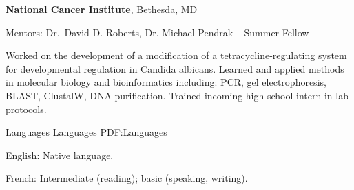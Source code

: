 \documentclass[letterpaper,MMMyyyy,nonstopmode]{simpleresumecv}
\begin{document}
\begin{Body}
\Entry
{\textbf{National Cancer Institute}},
Bethesda, MD

\Gap
\BulletItem
Mentors: Dr.~David D. Roberts, Dr. Michael Pendrak
\hfill
{}--
\newline
Summer Fellow
\begin{Detail}
\SubBulletItem
Worked on the development of a modification of a tetracycline-regulating system for developmental regulation in Candida albicans.
\SubBulletItem
Learned and applied methods in molecular biology and bioinformatics including: PCR, gel electrophoresis, BLAST, ClustalW, DNA purification.
\SubBulletItem
Trained incoming high school intern in lab protocols.
\end{Detail}


\Section
{Languages}
{Languages}
{PDF:Languages}

\BulletItem
English: Native language.

\Gap
\BulletItem
French: Intermediate (reading); basic (speaking, writing).



\end{Body}

\BigGap
\UseNoteFont%
\null\hfill%
\end{document}
